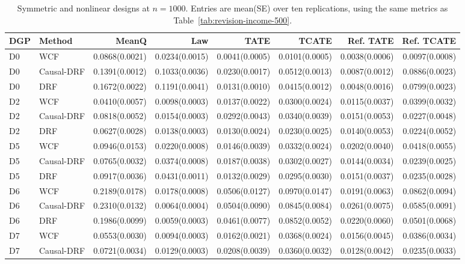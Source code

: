 \begin{table}[t]
\centering
\scriptsize
\setlength{\tabcolsep}{3pt}
\caption{Symmetric and nonlinear designs at $n=1000$. Entries are mean(SE) over ten replications, using the same metrics as Table~\ref{tab:revision-income-500}.}
\label{tab:revision-abstract}
\begin{tabular}{llrrrrrr}
\toprule
DGP & Method & MeanQ & Law & TATE & TCATE & Ref. TATE & Ref. TCATE \\
\midrule
D0 & WCF & 0.0868(0.0021) & 0.0234(0.0015) & 0.0041(0.0005) & 0.0101(0.0005) & 0.0038(0.0006) & 0.0097(0.0008) \\
D0 & Causal-DRF & 0.1391(0.0012) & 0.1033(0.0036) & 0.0230(0.0017) & 0.0512(0.0013) & 0.0087(0.0012) & 0.0886(0.0023) \\
D0 & DRF & 0.1672(0.0022) & 0.1191(0.0041) & 0.0131(0.0010) & 0.0415(0.0012) & 0.0048(0.0016) & 0.0799(0.0023) \\
D2 & WCF & 0.0410(0.0057) & 0.0098(0.0003) & 0.0137(0.0022) & 0.0300(0.0024) & 0.0115(0.0037) & 0.0399(0.0032) \\
D2 & Causal-DRF & 0.0818(0.0052) & 0.0154(0.0003) & 0.0292(0.0043) & 0.0340(0.0039) & 0.0151(0.0053) & 0.0227(0.0048) \\
D2 & DRF & 0.0627(0.0028) & 0.0138(0.0003) & 0.0130(0.0024) & 0.0230(0.0025) & 0.0140(0.0053) & 0.0224(0.0052) \\
D5 & WCF & 0.0946(0.0153) & 0.0220(0.0008) & 0.0146(0.0039) & 0.0332(0.0024) & 0.0202(0.0040) & 0.0418(0.0055) \\
D5 & Causal-DRF & 0.0765(0.0032) & 0.0374(0.0008) & 0.0187(0.0038) & 0.0302(0.0027) & 0.0144(0.0034) & 0.0239(0.0025) \\
D5 & DRF & 0.0917(0.0036) & 0.0431(0.0011) & 0.0132(0.0029) & 0.0295(0.0030) & 0.0151(0.0037) & 0.0235(0.0028) \\
D6 & WCF & 0.2189(0.0178) & 0.0178(0.0008) & 0.0506(0.0127) & 0.0970(0.0147) & 0.0191(0.0063) & 0.0862(0.0094) \\
D6 & Causal-DRF & 0.2310(0.0132) & 0.0064(0.0004) & 0.0504(0.0090) & 0.0845(0.0084) & 0.0261(0.0075) & 0.0585(0.0091) \\
D6 & DRF & 0.1986(0.0099) & 0.0059(0.0003) & 0.0461(0.0077) & 0.0852(0.0052) & 0.0220(0.0060) & 0.0501(0.0068) \\
D7 & WCF & 0.0553(0.0030) & 0.0094(0.0003) & 0.0162(0.0021) & 0.0368(0.0024) & 0.0156(0.0045) & 0.0386(0.0034) \\
D7 & Causal-DRF & 0.0721(0.0034) & 0.0129(0.0003) & 0.0208(0.0039) & 0.0360(0.0032) & 0.0128(0.0042) & 0.0235(0.0033) \\

\end{tabular}
\end{table}
